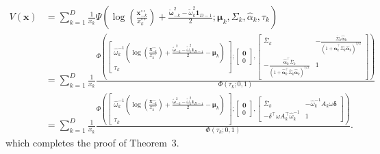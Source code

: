 \documentclass[12pt]{article}
\begin{document}
\begin{align*}
V(\bm x) &= \sum_{k=1}^D \frac{1}{x_k}
\Psi \left( \log \left( \frac{\bm x^{\circ\circ}_{-k}}{x^{\circ\circ}_k} \right) + \frac{\tilde{\bm \omega}_{-k}^2 - \tilde{\omega}_k^2\bm 1_{D-1}}{2} ; \bm \mu_k, \Sigma_k, \hat{\alpha}_k, \tau_k \right) \\
%
&= \sum_{k=1}^D \frac{1}{x_k} 
\frac{\Phi \left(
    \begin{bmatrix} 
        \hat{\omega}_k^{-1}\left( \log \left( \frac{\bm x^{\circ\circ}_{-k}}{x^{\circ\circ}_k} \right) + \frac{\tilde{\bm \omega}_{-k}^2 - \tilde{\omega}_k^2\bm 1_{D-1}}{2} - \bm \mu_k\right)  \\
        \tau_k
    \end{bmatrix};
    \begin{bmatrix} 
    \bm 0 \\ 0
    \end{bmatrix},
    \begin{bmatrix}
        \bar\Sigma_k & -\frac{\bar{\Sigma}_k \hat{\bm\alpha}_k}{(1+\hat{\bm\alpha}_k^\top\bar{\Sigma}_k \hat{\bm\alpha}_k)^{1/2}} \\
       -\frac{\hat{\bm\alpha}_k^\top\bar{\Sigma}_k}{\left(1+\hat{\bm\alpha}_k^\top\bar{\Sigma}_k \hat{\bm\alpha}_k\right)^{1/2}} &	1
    \end{bmatrix} \right)
    }
    {\Phi\left(\tau_k; 0, 1\right)} \\
&= \sum_{k=1}^D \frac{1}{x_k} 
\frac{\Phi \left(
    \begin{bmatrix} 
        \hat{\omega}_k^{-1}\left( \log \left( \frac{\bm x^{\circ\circ}_{-k}}{x^{\circ\circ}_k} \right) + \frac{\tilde{\bm \omega}_{-k}^2 - \tilde{\omega}_k^2\bm 1_{D-1}}{2} - \bm \mu_k\right)  \\
        \tau_k
    \end{bmatrix};
    \begin{bmatrix} 
    \bm 0 \\ 0
    \end{bmatrix},
    \begin{bmatrix}
        \bar\Sigma_k & - \hat{\omega}_k^{-1} A_k \omega \bm \delta \\
       - \delta^\top \omega A_k^\top \hat{\omega}_k^{-1} &	1
    \end{bmatrix} \right)
    }
    {\Phi\left(\tau_k; 0, 1\right)}.
\end{align*}
%
which completes the proof of Theorem~3.
\end{document}
